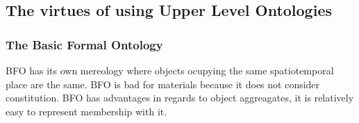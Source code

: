\subsection{The virtues of using Upper Level Ontologies}



\subsubsection{The Basic Formal Ontology}

BFO has its own mereology where objects ocupying the same spatiotemporal place
are the same. BFO is bad for materials because it does not consider constitution.
BFO has advantages in regards to object aggreagates, it is relatively easy to represent
membership with it. 
